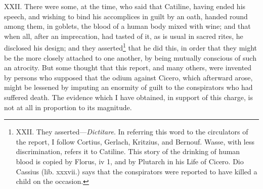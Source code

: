 XXII. There were some, at the time, who said that Catiline, having
ended his speech, and wishing to bind his accomplices in guilt by an
oath, handed round among them, in goblets, the blood of a human body
mixed with wine; and that when all, after an imprecation, had tasted
of it, as is usual in sacred rites, he disclosed his design; and they
asserted\footnote{XXII. They asserted—\emph{Dictitare}. In referring this word to
the circulators of the report, I follow Cortius, Gerlach, Kritzius,
and Bernouf. Wasse, with less discrimination, refers it to Catiline.
This story of the drinking of human blood is copied by Florus, iv 1,
and by Plutarch in his Life of Cicero. Dio Cassius (lib. xxxvii.) says
that the conspirators were reported to have killed a child on the
occasion.} that he did this, in order that they might be the more
closely attached to one another, by being mutually conscious of such
an atrocity. But some thought that this report, and many others, were
invented by persons who supposed that the odium against Cicero, which
afterward arose, might be lessened by imputing an enormity of guilt to
the conspirators who had suffered death. The evidence which I have
obtained, in support of this charge, is not at all in proportion to
its magnitude.

